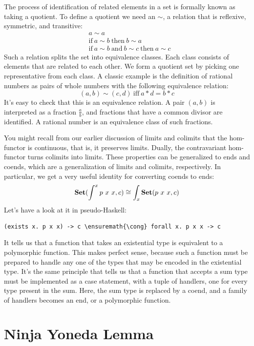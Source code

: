 The process of identification of related elements in a set is formally
known as taking a quotient. To define a quotient we need an
 $\sim$, a relation that
is reflexive, symmetric, and transitive:
\begin{align*}
&a \sim a \\
&\text{if}\ a \sim b\ \text{then}\ b \sim a \\
&\text{if}\ a \sim b\ \text{and}\ b \sim c\ \text{then}\ a \sim c
\end{align*}
Such a relation splits the set into equivalence classes. Each class
consists of elements that are related to each other. We form a quotient
set by picking one representative from each class. A classic example is
the definition of rational numbers as pairs of whole numbers with the
following equivalence relation:
\[(a, b) \sim (c, d)\ \text{iff}\ a * d = b * c\]
It's easy to check that this is an equivalence relation. A pair
$(a, b)$ is interpreted as a fraction $\frac{a}{b}$, and
fractions that have a common divisor are identified. A rational number
is an equivalence class of such fractions.

You might recall from our earlier discussion of limits and colimits that
the hom-functor is continuous, that is, it preserves limits. Dually, the
contravariant hom-functor turns colimits into limits. These properties
can be generalized to ends and coends, which are a generalization of
limits and colimits, respectively. In particular, we get a very useful
identity for converting coends to ends:
\[\Set(\int^x p\ x\ x, c) \cong \int_x \Set(p\ x\ x, c)\]
Let's have a look at it in pseudo-Haskell:

\begin{Verbatim}[commandchars=\\\{\}]
(exists x. p x x) -> c \ensuremath{\cong} forall x. p x x -> c
\end{Verbatim}
It tells us that a function that takes an existential type is equivalent
to a polymorphic function. This makes perfect sense, because such a
function must be prepared to handle any one of the types that may be
encoded in the existential type. It's the same principle that tells us
that a function that accepts a sum type must be implemented as a case
statement, with a tuple of handlers, one for every type present in the
sum. Here, the sum type is replaced by a coend, and a family of handlers
becomes an end, or a polymorphic function.

\section{Ninja Yoneda Lemma}

